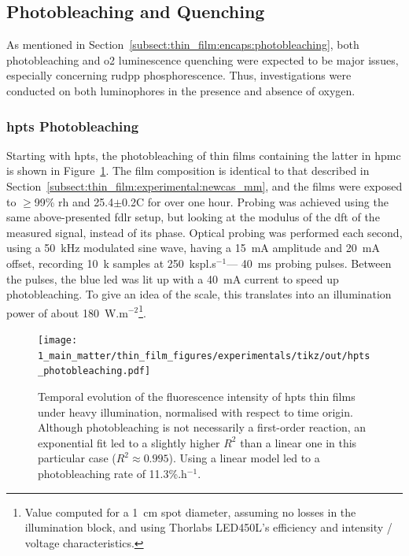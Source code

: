 \subsection{Photobleaching and Quenching}\label{subsect:thin_film:experimental:pbl}

As mentioned in Section~\ref{subsect:thin_film:encaps:photobleaching}, both photobleaching and \gls{o2} luminescence quenching were expected to be major issues, especially concerning \gls{rudpp} phosphorescence. Thus, investigations were conducted on both luminophores in the presence and absence of oxygen.

\subsubsection{\texorpdfstring{\gls{hpts}}{HPTS} Photobleaching}\label{subsect:thin_film:experimental:pbl:hpts}

Starting with \gls{hpts}, the photobleaching of thin films containing the latter in \gls{hpmc} is shown in Figure~\ref{fig:thin_film:experimental:hpts_photobleaching}. The film composition is identical to that described in Section~\ref{subsect:thin_film:experimental:newcas_mm}, and the films were exposed to $\geq$99\% \gls{rh} and 25.4$\pm$0.2{\degree}C for over one hour. Probing was achieved using the same above-presented \gls{fdlr} setup, but looking at the modulus of the \gls{dft} of the measured signal, instead of its phase. Optical probing was performed each second, using a 50~kHz modulated sine wave, having a 15~mA amplitude and 20~mA offset, recording 10~k samples at 250~kspl.s$^{-1}$---\ie{} 40~ms probing pulses. Between the pulses, the blue \gls{led} was lit up with a 40~mA current to speed up photobleaching. To give an idea of the scale, this translates into an illumination power of about 180~W.m$^{-2}$\footnote{Value computed for a 1~cm spot diameter, assuming no losses in the illumination block, and using Thorlabs LED450L's efficiency and intensity / voltage characteristics.}.

\begin{figure}
	\centering
	\texttt{[image: 1\_main\_matter/thin\_film\_figures/experimentals/tikz/out/hpts\_photobleaching.pdf]}
	\caption[\gls{hpts} photobleaching.]{Temporal evolution of the fluorescence intensity of \gls{hpts} thin films under heavy illumination, normalised with respect to time origin. Although photobleaching is not necessarily a first-order reaction\cite{demchenko2020}, an exponential fit led to a slightly higher $R^2$ than a linear one in this particular case ($R^2 \approx 0.995$). Using a linear model led to a photobleaching rate of 11.3\%.h$^{-1}$.}
	\label{fig:thin_film:experimental:hpts_photobleaching}
\end{figure}

